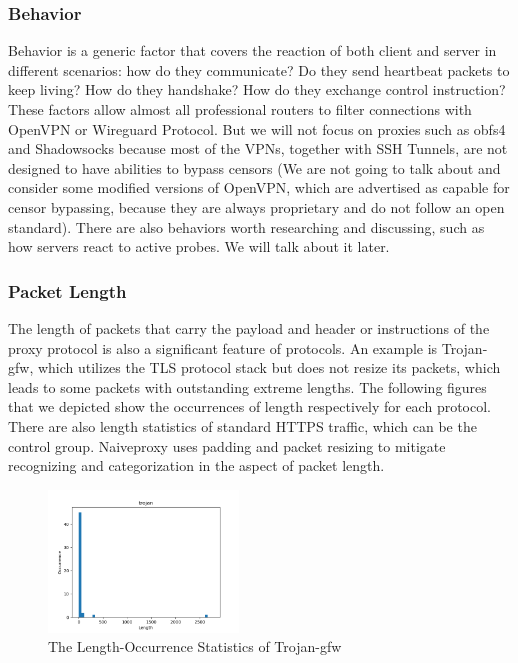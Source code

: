 \documentclass[conference]{IEEEtran}
\begin{document}
\subsubsection{Behavior}
Behavior is a generic factor that covers the reaction of both client and server in different scenarios: how do they communicate? Do they send heartbeat packets to keep living? How do they handshake? How do they exchange control instruction? These factors allow almost all professional routers to filter connections with OpenVPN or Wireguard Protocol. But we will not focus on proxies such as obfs4 and Shadowsocks because most of the VPNs, together with SSH Tunnels, are not designed to have abilities to bypass censors (We are not going to talk about and consider some modified versions of OpenVPN, which are advertised as capable for censor bypassing, because they are always proprietary and do not follow an open standard). There are also behaviors worth researching and discussing, such as how servers react to active probes. We will talk about it later.

\subsubsection{Packet Length}
The length of packets that carry the payload and header or instructions of the proxy protocol is also a significant feature of protocols. An example is Trojan-gfw, which utilizes the TLS protocol stack but does not resize its packets, which leads to some packets with outstanding extreme lengths.
The following figures that we depicted show the occurrences of length respectively for each protocol.
There are also length statistics of standard HTTPS traffic, which can be the control group. Naiveproxy uses padding and packet resizing to mitigate recognizing and categorization in the aspect of packet length.

\begin{figure}[H]
    \centering
    \includegraphics[width=0.45\textwidth]{pics/occurrence_of_length_trojan.png}
    \caption{The Length-Occurrence Statistics of Trojan-gfw}
\end{figure}
\end{document}
